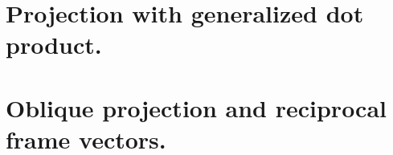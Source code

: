 \documentclass{article}      %
\newcommand{\transpose}[1]{{{#1}^{\text{T}}}}
\begin{document}
\section{ Projection with generalized dot product. }

\section{ Oblique projection and reciprocal frame vectors. }




















%
%
%




%
\end{document}
